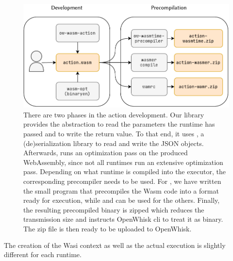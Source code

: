 
\begin{figure}
    \includegraphics{figures/ActionCreationFlow.pdf}
    \caption{There are two phases in the action development. Our  library provides the abstraction to read the parameters the runtime has passed and to write the return value. To that end, it uses , a (de)serialization library to read and write the JSON objects. Afterwards,  runs an optimization pass on the produced WebAssembly, since not all runtimes run an extensive optimization pass.
    Depending on what runtime is compiled into the executor, the corresponding precompiler needs to be used. For , we have written the small  program that precompiles the Wasm code into a format ready for execution, while  and  can be used for the others. Finally, the resulting precompiled binary is zipped which reduces the transmission size and instructs OpenWhisk cli to treat it as binary. The zip file is then ready to be uploaded to OpenWhisk.}
    \label{fig:action-creation-flow}
\end{figure}

The creation of the Wasi context as well as the actual execution is slightly different for each runtime.


